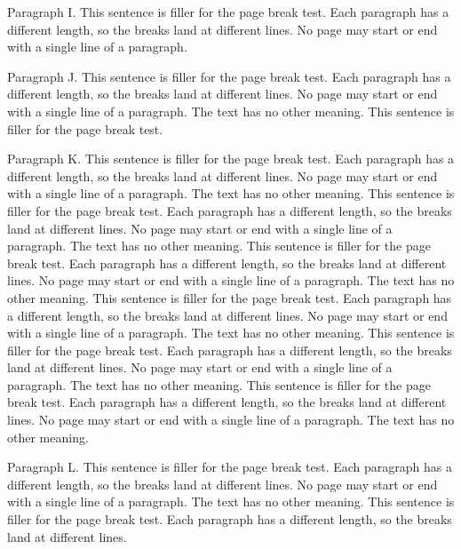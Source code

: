 Paragraph I. This sentence is filler for the page break test. Each paragraph
has a different length, so the breaks land at different lines. No page may
start or end with a single line of a paragraph.

Paragraph J. This sentence is filler for the page break test. Each paragraph
has a different length, so the breaks land at different lines. No page may
start or end with a single line of a paragraph. The text has no other meaning.
This sentence is filler for the page break test.

Paragraph K. This sentence is filler for the page break test. Each paragraph
has a different length, so the breaks land at different lines. No page may
start or end with a single line of a paragraph. The text has no other meaning.
This sentence is filler for the page break test. Each paragraph has a
different length, so the breaks land at different lines. No page may start or
end with a single line of a paragraph. The text has no other meaning. This
sentence is filler for the page break test. Each paragraph has a different
length, so the breaks land at different lines. No page may start or end with a
single line of a paragraph. The text has no other meaning. This sentence is
filler for the page break test. Each paragraph has a different length, so the
breaks land at different lines. No page may start or end with a single line of
a paragraph. The text has no other meaning. This sentence is filler for the
page break test. Each paragraph has a different length, so the breaks land at
different lines. No page may start or end with a single line of a paragraph.
The text has no other meaning. This sentence is filler for the page break
test. Each paragraph has a different length, so the breaks land at different
lines. No page may start or end with a single line of a paragraph. The text
has no other meaning.

Paragraph L. This sentence is filler for the page break test. Each paragraph
has a different length, so the breaks land at different lines. No page may
start or end with a single line of a paragraph. The text has no other meaning.
This sentence is filler for the page break test. Each paragraph has a
different length, so the breaks land at different lines.


